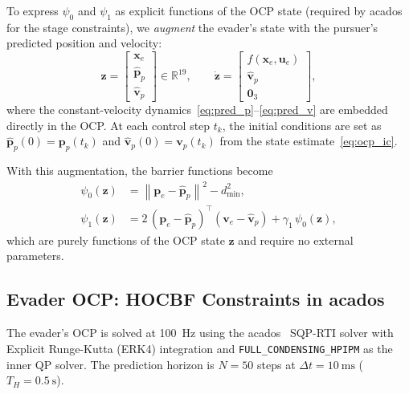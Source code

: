 \documentclass[lettersize,journal]{IEEEtran}
\theoremstyle{definition}
\theoremstyle{remark}
\newcommand{\R}{\mathbb{R}}
\newcommand{\norm}[1]{\left\| #1 \right\|}
\newcommand{\vect}[1]{\bm{#1}}
\begin{document}
To express $\psi_0$ and $\psi_1$ as explicit functions of the OCP
state (required by acados for the stage constraints), we
\emph{augment} the evader's state with the pursuer's predicted
position and velocity:
\begin{equation}
    \vect{z} =
    \begin{bmatrix}
        \vect{x}_e \\ \hat{\vect{p}}_p \\ \hat{\vect{v}}_p
    \end{bmatrix}
    \in \R^{19},
    \qquad
    \dot{\vect{z}} = \begin{bmatrix}
        f(\vect{x}_e, \vect{u}_e) \\
        \hat{\vect{v}}_p \\ \vect{0}_3
    \end{bmatrix},
    \label{eq:aug_state}
\end{equation}
where the constant-velocity
dynamics~\eqref{eq:pred_p}--\eqref{eq:pred_v} are embedded directly
in the OCP.
At each control step $t_k$, the initial conditions are set
as $\hat{\vect{p}}_p(0) = \vect{p}_p(t_k)$ and
$\hat{\vect{v}}_p(0) = \vect{v}_p(t_k)$
from the state estimate~\eqref{eq:ocp_ic}.

With this augmentation, the barrier functions become
\begin{align}
    \psi_0(\vect{z}) &= \norm{\vect{p}_e - \hat{\vect{p}}_p}^2
                        - d_{\min}^2,
                        \label{eq:psi0_aug} \\
    \psi_1(\vect{z}) &= 2\,(\vect{p}_e-\hat{\vect{p}}_p)^\top
                         (\vect{v}_e-\hat{\vect{v}}_p)
                         + \gamma_1\,\psi_0(\vect{z}),
                        \label{eq:psi1_aug}
\end{align}
which are purely functions of the OCP state $\vect{z}$ and require
no external parameters.

\subsection{Evader OCP: HOCBF Constraints in acados}
\label{sec:evader_ocp}

The evader's OCP is solved at \SI{100}{\hertz} using the
acados~\cite{verschueren2022acados} SQP-RTI solver with
Explicit Runge-Kutta (ERK4) integration and
\texttt{FULL\_CONDENSING\_HPIPM} as the inner QP solver.
The prediction horizon is $N=50$ steps at $\Delta t = \SI{10}{\milli\second}$
($T_H = \SI{0.5}{\second}$).
\end{document}
